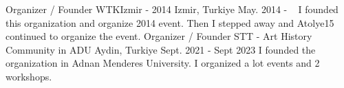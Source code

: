 \begin{cventries}
{    }
    \vspace{0.5cm}
    \cventry
    {Organizer / Founder} %
    {WTKIzmir - 2014} %
    {Izmir, Turkiye} %
    {May. 2014 - ~} %
    {
I founded this organization and organize 2014 event. Then I stepped away and Atolye15 continued to organize the event. 
    }
    \vspace{0.5cm}
    \cventry
    {Organizer / Founder} %
    {STT - Art History Community in ADU} %
    {Aydin, Turkiye} %
    {Sept. 2021 - Sept 2023} %
    {
      I founded the organization in Adnan Menderes University. I organized a lot events and 2 workshops. 
    }
    \vspace{0.5cm}


\end{cventries}
